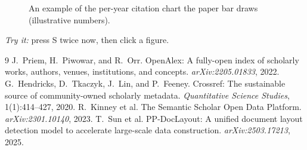 \documentclass[11pt]{article}
\begin{document}
\begin{figure}[h]
\centering
{}
\caption{An example of the per-year citation chart the paper bar draws
(illustrative numbers).}
\label{fig:plot}
\end{figure}

\noindent\emph{Try it:} press \textsf{S} twice now, then click a figure.

\begin{thebibliography}{9}
 J.~Priem, H.~Piwowar, and R.~Orr. OpenAlex: A fully-open
index of scholarly works, authors, venues, institutions, and concepts.
\emph{arXiv:2205.01833}, 2022.
 G.~Hendricks, D.~Tkaczyk, J.~Lin, and P.~Feeney. Crossref:
The sustainable source of community-owned scholarly metadata.
\emph{Quantitative Science Studies}, 1(1):414--427, 2020.
 R.~Kinney et al. The Semantic Scholar Open Data Platform.
\emph{arXiv:2301.10140}, 2023.
 T.~Sun et al. PP-DocLayout: A unified document layout
detection model to accelerate large-scale data construction.
\emph{arXiv:2503.17213}, 2025.
\end{thebibliography}
\end{document}
